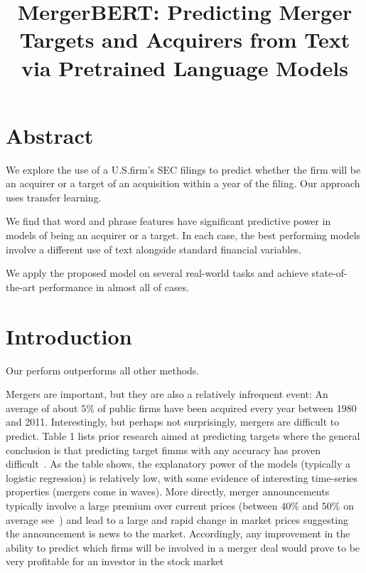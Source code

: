 \documentclass[11pt]{article}
\title{\vspace{-4cm} MergerBERT: Predicting Merger Targets and Acquirers from Text via Pretrained Language Models}
\author{}
\date{}
\begin{document}
\maketitle

\section{Abstract}

We explore the use of a U.S.firm's SEC filings to predict whether the firm will be
an acquirer or a target of an acquisition within a year of the
filing. Our approach uses transfer learning.

We find that word and phrase features have significant predictive power in models of being an acquirer or a target. In each case, the
best performing models involve a different use of text alongside
standard financial variables.

We apply the proposed model on several real-world tasks and achieve
state-of-the-art performance in almost all of cases.

\section{Introduction}

Our perform outperforms all other methods.

Mergers are important, but they are also a relatively infrequent event: An average of
about $5\%$ of public firms have been acquired every year between 1980
and 2011. Interestingly, but perhaps not surprisingly, mergers are difficult to predict. Table 1 lists prior
research aimed at predicting targets where the general conclusion is
that predicting target fimms with any accuracy has proven difficult~\cite{betton2008}.
As the table shows, the explanatory power of the models (typically a logistic regression)
is relatively low, with some evidence of interesting time-series
properties (mergers come in waves). More directly, merger announcements typically involve a large premium over
current prices (between $40\%$ and $50\%$ on average see~\cite{eckbo2014}) and lead to a large and
rapid change in market prices suggesting the announcement is news to the market. Accordingly,
any improvement in the ability to predict which firms will be involved in a merger deal
would prove to be very profitable for an investor in the stock market
\end{document}
